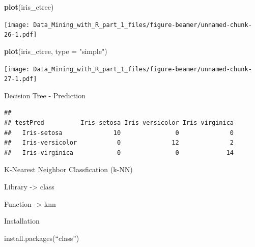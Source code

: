 \documentclass[ignorenonframetext,]{beamer}
\newenvironment{Shaded}{\begin{snugshade}}{\end{snugshade}}
\newcommand{\KeywordTok}[1]{\textcolor[rgb]{0.13,0.29,0.53}{\textbf{{#1}}}}
\newcommand{\DataTypeTok}[1]{\textcolor[rgb]{0.13,0.29,0.53}{{#1}}}
\newcommand{\StringTok}[1]{\textcolor[rgb]{0.31,0.60,0.02}{{#1}}}
\newcommand{\CommentTok}[1]{\textcolor[rgb]{0.56,0.35,0.01}{\textit{{#1}}}}
\newcommand{\NormalTok}[1]{{#1}}
\begin{document}
\begin{frame}[fragile]{}

\begin{Shaded}
\begin{Highlighting}[]
\KeywordTok{plot}\NormalTok{(iris_ctree)}
\end{Highlighting}
\end{Shaded}

\texttt{[image: Data\_Mining\_with\_R\_part\_1\_files/figure-beamer/unnamed-chunk-26-1.pdf]}

\end{frame}

\begin{frame}[fragile]{}

\begin{Shaded}
\begin{Highlighting}[]
\KeywordTok{plot}\NormalTok{(iris_ctree, }\DataTypeTok{type =} \StringTok{"simple"}\NormalTok{)}
\end{Highlighting}
\end{Shaded}

\texttt{[image: Data\_Mining\_with\_R\_part\_1\_files/figure-beamer/unnamed-chunk-27-1.pdf]}

\end{frame}

\begin{frame}[fragile]{Decision Tree - Prediction}

\begin{Shaded}
\end{Shaded}

\begin{verbatim}
##                  
## testPred          Iris-setosa Iris-versicolor Iris-virginica
##   Iris-setosa              10               0              0
##   Iris-versicolor           0              12              2
##   Iris-virginica            0               0             14
\end{verbatim}

\end{frame}

\begin{frame}{K-Nearest Neighbor Classfication (k-NN)}

Library -\textgreater{} class

Function -\textgreater{} knn

Installation

install.packages(``class'')

\end{frame}
\end{document}
